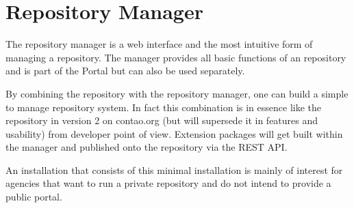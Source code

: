 \section[sec:repository manager]{Repository Manager}

The repository manager is a web interface and the most intuitive form of managing a repository. The manager provides all basic functions of an repository and is part of the Portal but can also be used separately.

By combining the repository with the repository manager, one can build a simple to manage repository system. In fact this combination is in essence like the repository in version 2 on contao.org (but will supersede it in features and usability) from developer point of view. Extension packages will get built within the manager and published onto the repository via the REST API.

An installation that consists of this minimal installation is mainly of interest for agencies that want to run a private repository and do not intend to provide a public portal.
